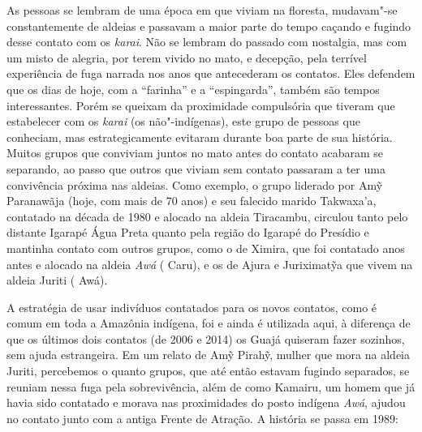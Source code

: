 As pessoas se lembram de uma época em que viviam na floresta, mudavam"-se
constantemente de aldeias e passavam a maior parte do tempo caçando e
fugindo desse contato com os \emph{karai}. Não se lembram do passado com
nostalgia, mas com um misto de alegria, por terem vivido no mato, e
decepção, pela terrível experiência de fuga narrada nos anos que
antecederam os contatos. Eles defendem que os dias de hoje, com a
``farinha'' e a ``espingarda'', também são tempos interessantes. Porém
se queixam da proximidade compulsória que tiveram que estabelecer com os
\emph{karai} (os não"-indígenas), este grupo de pessoas que conheciam,
mas estrategicamente evitaram durante boa parte de sua história. Muitos
grupos que conviviam juntos no mato antes do contato acabaram se
separando, ao passo que outros que viviam sem contato passaram a ter uma
convivência próxima nas aldeias. Como exemplo, o grupo liderado por Amỹ
Paranawãja (hoje, com mais de 70 anos) e seu falecido marido Takwaxa'a,
contatado na década de 1980 e alocado na aldeia Tiracambu, circulou
tanto pelo distante Igarapé Água Preta quanto pela região do Igarapé do
Presídio e mantinha contato com outros grupos, como o de Ximira, que foi
contatado anos antes e alocado na aldeia \emph{Awá} ( Caru), e os de
Ajura e Juriximatỹa que vivem na aldeia Juriti ( Awá).

A estratégia de usar indivíduos contatados para os novos contatos, como
é comum em toda a Amazônia indígena, foi e ainda é utilizada aqui, à
diferença de que os últimos dois contatos (de 2006 e 2014) os Guajá
quiseram fazer sozinhos, sem ajuda estrangeira. Em um relato de Amỹ
Pirahỹ, mulher que mora na aldeia Juriti, percebemos o quanto grupos,
que até então estavam fugindo separados, se reuniam nessa fuga pela
sobrevivência, além de como Kamairu, um homem que já havia sido
contatado e morava nas proximidades do posto indígena \emph{Awá}, ajudou
no contato junto com a antiga Frente de Atração. A história se passa em
1989:

